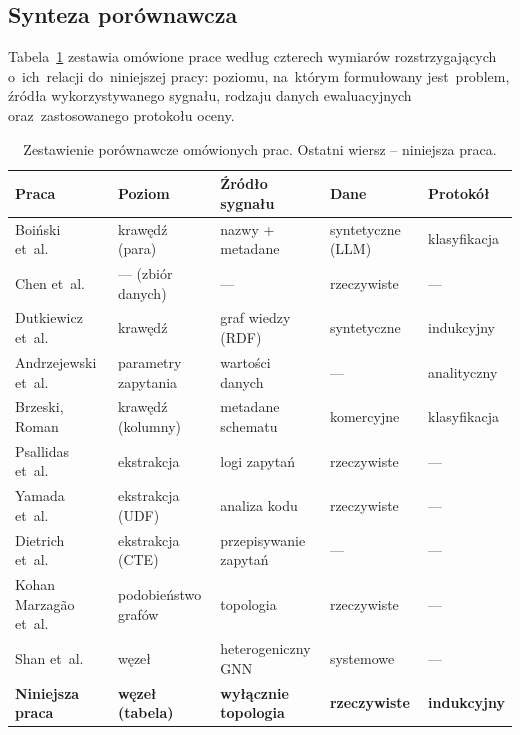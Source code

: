 \documentclass[polish,master,a4paper,oneside]{ppfcmthesis}
\renewcommand{\_}{\origtextunderscore\ifmmode\else\allowbreak\fi}
\begin{document}
\subsection{Synteza porównawcza}
\label{sec:slr-synteza}

Tabela~\ref{tab:slr-synteza} zestawia omówione prace według czterech wymiarów
rozstrzygających o~ich~relacji do~niniejszej pracy: poziomu, na~którym
formułowany jest~problem, źródła wykorzystywanego sygnału, rodzaju danych
ewaluacyjnych oraz~zastosowanego protokołu oceny.

\begin{table}[ht]
\centering
\caption[Zestawienie porównawcze omówionych prac]{Zestawienie porównawcze omówionych prac. Ostatni wiersz –
niniejsza praca.}
\label{tab:slr-synteza}
\footnotesize
\setlength{\tabcolsep}{5pt}
\begin{tabular}{@{}lllll@{}}
\toprule
\textbf{Praca} & \textbf{Poziom} & \textbf{Źródło sygnału} &
\textbf{Dane} & \textbf{Protokół} \\
\midrule
Boiński et~al.~\cite{Boinski2025}
  & krawędź (para) & nazwy + metadane & syntetyczne (LLM) & klasyfikacja \\
Chen et~al.~\cite{Chen2024}
  & --- (zbiór danych) & --- & rzeczywiste & --- \\
Dutkiewicz et~al.~\cite{Dutkiewicz2026}
  & krawędź & graf wiedzy (RDF) & syntetyczne & indukcyjny \\
Andrzejewski et~al.~\cite{Andrzejewski2026}
  & parametry zapytania & wartości danych & --- & analityczny \\
Brzeski, Roman~\cite{Brzeski2025}
  & krawędź (kolumny) & metadane schematu & komercyjne & klasyfikacja \\
Psallidas et~al.~\cite{Psallidas2023}
  & ekstrakcja & logi zapytań & rzeczywiste & --- \\
Yamada et~al.~\cite{Yamada2023}
  & ekstrakcja (UDF) & analiza kodu & rzeczywiste & --- \\
Dietrich et~al.~\cite{Dietrich2022}
  & ekstrakcja (CTE) & przepisywanie zapytań & --- & --- \\
Kohan Marzagão et~al.~\cite{KohanMarzagao2025}
  & podobieństwo grafów & topologia & rzeczywiste & --- \\
Shan et~al.~\cite{Shan2024}
  & węzeł & heterogeniczny GNN & systemowe & --- \\
\midrule
\textbf{Niniejsza praca}
  & \textbf{węzeł (tabela)} & \textbf{wyłącznie topologia} &
    \textbf{rzeczywiste} & \textbf{indukcyjny} \\
\bottomrule
\end{tabular}
\end{table}
\end{document}
